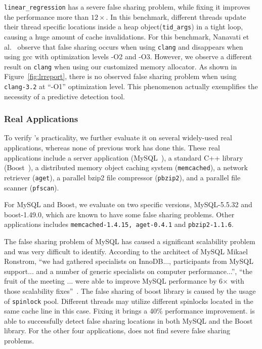 \texttt{linear\_regression} has a severe false sharing problem, 
while fixing it improves the performance more than $12\times$.
In this benchmark, different threads update their thread specific locations 
inside a heap object(\texttt{tid\_args}) in a tight loop, 
causing a huge amount of cache invalidations. 
For this benchmark, Nanavati et al.~\cite{OSdetection} observe that 
false sharing occurs when using \texttt{clang} 
and disappears when using gcc with optimization levels -O2 and -O3.  
However, we observe a different result on \texttt{clang} when using our customized memory allocator. As shown in Figure~\ref{fig:lrreport}, there is no observed false sharing problem when using \texttt{clang-3.2} at ``-O1'' optimization level. This phenomenon actually exemplifies the necessity of a predictive detection tool. 

\subsubsection{Real Applications}
To verify \Predator{}'s practicality, we further evaluate it on several widely-used real applications, whereas none of previous work has done this. These real applications include a server application (MySQL~\cite{mysql}),
a standard C++ library (Boost~\cite{libfalsesharing}),
a distributed memory object caching system (\texttt{memcached}), a network retriever (\texttt{aget}),
a parallel bzip2 file compressor (\texttt{pbzip2}), and a parallel file scanner (\texttt{pfscan}).

For MySQL and Boost, we evaluate on two specific versions, MySQL-5.5.32 and boost-1.49.0, which are known to have some false sharing problems.
Other applications includes \texttt{memcached-1.4.15, 
aget-0.4.1} and \texttt{pbzip2-1.1.6}.

The false sharing problem of MySQL has caused a significant scalability problem and was very difficult to identify.
According to the architect of MySQL Mikael Ronstrom, ``we had gathered specialists on InnoDB..., participants from MySQL support... and a number of generic specialists on 
computer performance...'', ``the fruit of the meeting ... were able to improve MySQL performance by 6$\times$ with those scalability fixes''~\cite{mysql}. 
The false sharing of boost library is caused by the usage of \texttt{spinlock} pool. Different threads may utilize different spinlocks located in the same cache line in this case. Fixing it brings a 40\% performance improvement.
\Predator{} is able to successfully detect false sharing locations in both MySQL and the Boost library. 
For the other four applications, \Predator{} does not find severe false sharing problems.

